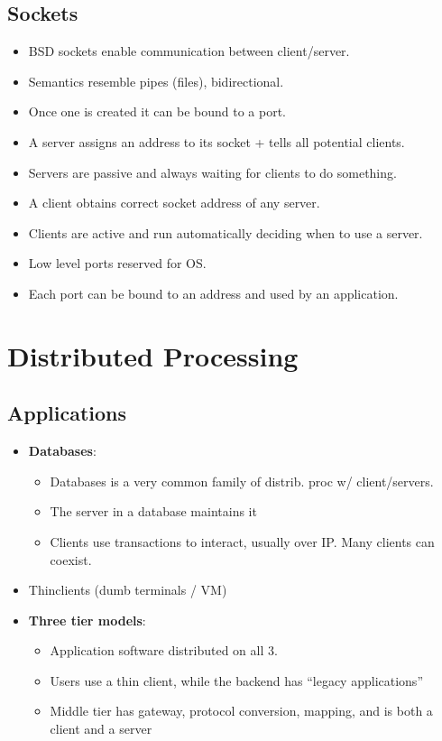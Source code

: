 \documentclass[fontsize=5pt]{scrartcl}
\begin{document}
\begin{multicols}{3}
      \subsection{Sockets}
        \begin{itemize}
          \item BSD sockets enable communication between client/server.
          \item Semantics resemble pipes (files), bidirectional.
          \item Once one is created it can be bound to a port.
          \item A server assigns an address to its socket + tells all potential clients.
          \item Servers are passive and always waiting for clients to do something.
          \item A client obtains correct socket address of any server.
          \item Clients are active and run automatically deciding when to use a server.
          \item Low level ports reserved for OS.
          \item Each port can be bound to an address and used by an application.
        \end{itemize}
  \section{Distributed Processing}
    \subsection{Applications}
      \begin{itemize}
        \item \textbf{Databases}:
        \begin{itemize}
          \item Databases is a very common family of distrib. proc w/ client/servers.
          \item The server in a database maintains it
          \item Clients use transactions to interact, usually over IP. Many clients can coexist.
        \end{itemize}
        \item Thinclients (dumb terminals / VM)
        \item \textbf{Three tier models}:
        \begin{itemize}
          \item Application software distributed on all 3.
          \item Users use a thin client, while the backend has ``legacy applications''
          \item Middle tier has gateway, protocol conversion, mapping, and is both a client and a server
        \end{itemize}
      \end{itemize}

\end{multicols}
\end{document}
